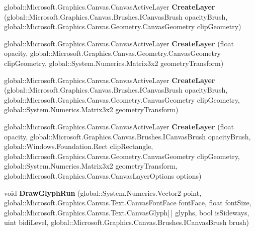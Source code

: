 \begin{DoxyCompactItemize}
global\+::\+Microsoft.\+Graphics.\+Canvas.\+Canvas\+Active\+Layer {\bfseries Create\+Layer} (global\+::\+Microsoft.\+Graphics.\+Canvas.\+Brushes.\+I\+Canvas\+Brush opacity\+Brush, global\+::\+Microsoft.\+Graphics.\+Canvas.\+Geometry.\+Canvas\+Geometry clip\+Geometry)
\item 
\mbox{\label{interface_microsoft_1_1_graphics_1_1_canvas_1_1_i_canvas_drawing_session_a502cde9c65a5fe437090c3ffdd7194b2}} 
global\+::\+Microsoft.\+Graphics.\+Canvas.\+Canvas\+Active\+Layer {\bfseries Create\+Layer} (float opacity, global\+::\+Microsoft.\+Graphics.\+Canvas.\+Geometry.\+Canvas\+Geometry clip\+Geometry, global\+::\+System.\+Numerics.\+Matrix3x2 geometry\+Transform)
\item 
\mbox{\label{interface_microsoft_1_1_graphics_1_1_canvas_1_1_i_canvas_drawing_session_a4495a3f1a04a5602f8c32b065c311d4d}} 
global\+::\+Microsoft.\+Graphics.\+Canvas.\+Canvas\+Active\+Layer {\bfseries Create\+Layer} (global\+::\+Microsoft.\+Graphics.\+Canvas.\+Brushes.\+I\+Canvas\+Brush opacity\+Brush, global\+::\+Microsoft.\+Graphics.\+Canvas.\+Geometry.\+Canvas\+Geometry clip\+Geometry, global\+::\+System.\+Numerics.\+Matrix3x2 geometry\+Transform)
\item 
\mbox{\label{interface_microsoft_1_1_graphics_1_1_canvas_1_1_i_canvas_drawing_session_a885c860f277d273712a3171ad33885b8}} 
global\+::\+Microsoft.\+Graphics.\+Canvas.\+Canvas\+Active\+Layer {\bfseries Create\+Layer} (float opacity, global\+::\+Microsoft.\+Graphics.\+Canvas.\+Brushes.\+I\+Canvas\+Brush opacity\+Brush, global\+::\+Windows.\+Foundation.\+Rect clip\+Rectangle, global\+::\+Microsoft.\+Graphics.\+Canvas.\+Geometry.\+Canvas\+Geometry clip\+Geometry, global\+::\+System.\+Numerics.\+Matrix3x2 geometry\+Transform, global\+::\+Microsoft.\+Graphics.\+Canvas.\+Canvas\+Layer\+Options options)
\item 
\mbox{\label{interface_microsoft_1_1_graphics_1_1_canvas_1_1_i_canvas_drawing_session_a61dd68b679424c00d8f797822aa12eac}} 
void {\bfseries Draw\+Glyph\+Run} (global\+::\+System.\+Numerics.\+Vector2 point, global\+::\+Microsoft.\+Graphics.\+Canvas.\+Text.\+Canvas\+Font\+Face font\+Face, float font\+Size, global\+::\+Microsoft.\+Graphics.\+Canvas.\+Text.\+Canvas\+Glyph\mbox{[}$\,$\mbox{]} glyphs, bool is\+Sideways, uint bidi\+Level, global\+::\+Microsoft.\+Graphics.\+Canvas.\+Brushes.\+I\+Canvas\+Brush brush)

\end{DoxyCompactItemize}

